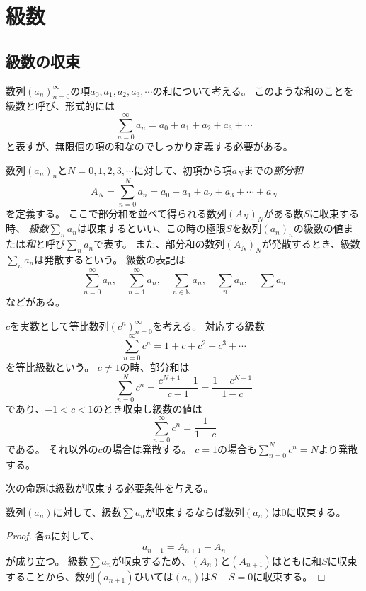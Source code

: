 
\chapter{級数}

\section{級数の収束}

数列$(a_n)_{n = 0}^\infty$の項$a_0, a_1, a_2, a_3, \cdots$の和について考える。
このような和のことを級数と呼び、形式的には
$$
\sum_{n = 0}^\infty a_n = a_0+a_1+a_2+a_3+\cdots
$$
と表すが、無限個の項の和なのでしっかり定義する必要がある。

\begin{definition}[級数]
数列$(a_n)_n$と$N = 0, 1, 2, 3, \cdots$に対して、初項から項$a_N$までの\emph{部分和}
$$
A_N = \sum_{n = 0}^N a_n = a_0+a_1+a_2+a_3+\cdots+a_N
$$
を定義する。
ここで部分和を並べて得られる数列$(A_N)_N$がある数$S$に収束する時、
\emph{級数}$\sum_n a_n$は収束するといい、この時の極限$S$を数列$(a_n)_n$の級数の値または\emph{和}と呼び$\sum_n a_n$で表す。
また、部分和の数列$(A_N)_N$が発散するとき、級数$\sum_n a_n$は発散するという。
級数の表記は
$$
\sum_{n = 0}^\infty a_n, \quad \sum_{n = 1}^\infty a_n, \quad \sum_{n \in \mathbb{N}}a_n, \quad \sum_n a_n, \quad \sum a_n
$$
などがある。
\end{definition}

\begin{example}
$c$を実数として等比数列$(c^n)_{n = 0}^\infty$を考える。
対応する級数
$$
\sum_{n = 0}^\infty c^n = 1+c+c^2+c^3+\cdots
$$
を等比級数という。
$c \ne 1$の時、部分和は
$$
\sum_{n = 0}^N c^n = \frac{c^{N+1}-1}{c-1} = \frac{1-c^{N+1}}{1-c}
$$
であり、$-1 < c < 1$のとき収束し級数の値は
$$
\sum_{n = 0}^\infty c^n = \frac{1}{1-c}
$$
である。
それ以外の$c$の場合は発散する。
$c = 1$の場合も$\sum_{n = 0}^N c^n = N$より発散する。
\end{example}

次の命題は級数が収束する必要条件を与える。

\begin{proposition}
\label{t_ser_conv}
数列$(a_n)$に対して、級数$\sum a_n$が収束するならば数列$(a_n)$は$0$に収束する。
\end{proposition}

\begin{proof}
各$n$に対して、
$$
a_{n+1} = A_{n+1}-A_n
$$
が成り立つ。
級数$\sum a_n$が収束するため、$(A_n)$と$(A_{n+1})$はともに和$S$に収束することから、数列$(a_{n+1})$ひいては$(a_n)$は$S-S = 0$に収束する。
\end{proof}

